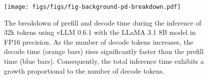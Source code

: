 \begin{figure}[ht]
\begin{center}
\centerline{\texttt{[image: figs/figs/fig-background-pd-breakdown.pdf]}}
\caption{The breakdown of prefill and decode time during the inference of 32k tokens using vLLM 0.6.1 with the LLaMA 3.1 8B model in FP16 precision. As the number of decode tokens increases, the decode time (orange bars) rises significantly faster than the prefill time (blue bars). Consequently, the total inference time exhibits a growth proportional to the number of decode tokens.}
\label{fig-background-pd-breakdown}
\end{center}
\end{figure}